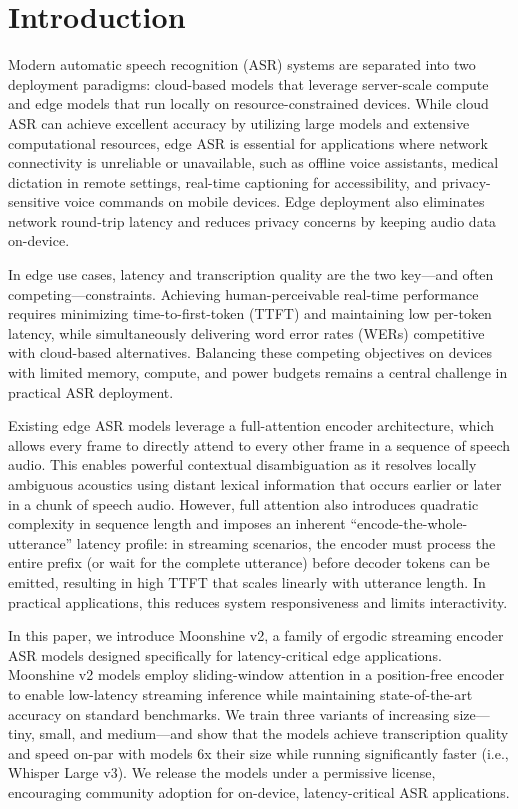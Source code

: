\section{Introduction}

Modern automatic speech recognition (ASR) systems are separated into two
deployment paradigms: cloud-based models that leverage server-scale compute and
edge models that run locally on resource-constrained devices. While cloud ASR
can achieve excellent accuracy by utilizing large models and extensive
computational resources, edge ASR is essential for applications where network
connectivity is unreliable or unavailable, such as offline voice assistants,
medical dictation in remote settings, real-time captioning for accessibility,
and privacy-sensitive voice commands on mobile devices. Edge deployment also
eliminates network round-trip latency and reduces privacy concerns by keeping
audio data on-device.

In edge use cases, latency and transcription quality are the two key---and often
competing---constraints. Achieving human-perceivable real-time performance
requires minimizing time-to-first-token (TTFT) and maintaining low per-token
latency, while simultaneously delivering word error rates (WERs) competitive
with cloud-based alternatives. Balancing these competing objectives on devices
with limited memory, compute, and power budgets remains a central challenge in
practical ASR deployment.

Existing edge ASR models leverage a full-attention encoder architecture, which
allows every frame to directly attend to every other frame in a sequence of
speech audio. This enables powerful contextual disambiguation as it resolves
locally ambiguous acoustics using distant lexical information that occurs
earlier or later in a chunk of speech audio. However, full attention also
introduces quadratic complexity in sequence length and imposes an inherent
``encode-the-whole-utterance'' latency profile: in streaming scenarios, the
encoder must process the entire prefix (or wait for the complete utterance)
before decoder tokens can be emitted, resulting in high TTFT that scales
linearly with utterance length. In practical applications, this reduces system
responsiveness and limits interactivity.

In this paper, we introduce Moonshine v2, a family of ergodic streaming encoder
ASR models designed specifically for latency-critical edge applications.
Moonshine v2 models employ sliding-window attention in a position-free encoder
to enable low-latency streaming inference while maintaining state-of-the-art
accuracy on standard benchmarks. We train three variants of increasing size---
tiny, small, and medium---and show that the models achieve transcription quality and
speed on-par with models 6x their size while running significantly faster (i.e., Whisper Large v3). 
We release the models under a permissive license, encouraging community adoption for on-device, 
latency-critical ASR applications.

